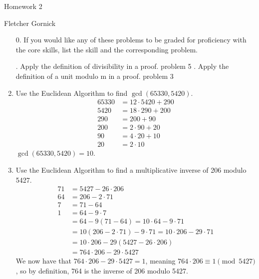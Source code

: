 \documentclass[11pt]{article}
\newcommand{\n}{\vspace{0.5cm}}
\begin{document}
  \begin{center}
    {\Large Homework 2} \n

    Fletcher Gornick
  \end{center}

  \begin{enumerate}
    \item[0.] If you would like any of these problems to be graded for proficiency with the core skills, list the skill and the corresponding problem.
      \begin{outline}
        . Apply the definition of divisibility in a proof.
          \2 problem 5
        . Apply the definition of a unit modulo m in a proof.
          \2 problem 3
      \end{outline} \n

    \item Use the Euclidean Algorithm to find \(\gcd(65330,5420)\).
      \begin{align*}
        65330 &= 12 \cdot 5420 + 290 \\
        5420  &= 18 \cdot 290 + 200 \\
        290   &= 200 + 90 \\
        200   &= 2 \cdot 90 + 20 \\
        90    &= 4 \cdot 20 + 10 \\
        20    &= 2 \cdot 10
      \end{align*}
      \(\gcd(65330,5420) = 10\).

    \item Use the Euclidean Algorithm to find a multiplicative inverse of 206 modulo 5427.
      \begin{align*}
        71 &= 5427 - 26 \cdot 206 \\
        64 &= 206 - 2 \cdot 71 \\
        7  &= 71 - 64 \\
        1  &= 64 - 9 \cdot 7 \\
           &= 64 - 9(71 - 64) = 10 \cdot 64 - 9 \cdot 71 \\
           &= 10(206 - 2 \cdot 71) - 9 \cdot 71 = 10 \cdot 206 - 29 \cdot 71 \\
           &= 10 \cdot 206 - 29(5427 - 26 \cdot 206) \\
           &= 764 \cdot 206 - 29 \cdot 5427
      \end{align*}
      We now have that \(764 \cdot 206 - 29 \cdot 5427 = 1\), meaning \(764 \cdot 206 \equiv 1 \pmod{5427}\), so by definition, 764 is the inverse of 206 modulo 5427.


\end{enumerate}
\end{document}

